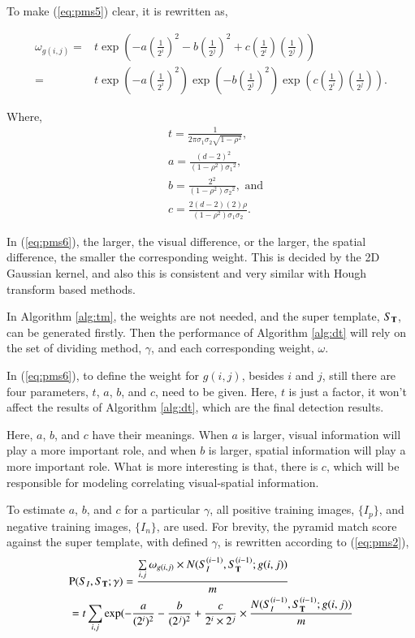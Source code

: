 \documentclass[paper]{ieice}
\begin{document}
To make (\ref{eq:pms5}) clear, it is rewritten as,

\begin{equation}
\label{eq:pms6}
\begin{aligned}
\omega_{g(i,j)}=& t \exp(-a (\frac 1 {2^i})^2 - b (\frac 1 {2^j})^2 + c (\frac 1 {2^i}) (\frac 1 {2^j}))\\
                =& t \exp(-a (\frac 1 {2^i})^2) \exp(- b (\frac 1 {2^j})^2 )\exp ( c (\frac 1 {2^i}) (\frac 1 {2^j})).
\end{aligned}
\end{equation}

Where,
\[\begin{aligned}
&t= \frac 1 {2 \pi \sigma_1 \sigma_2 \sqrt{1-\rho^2} } , \\
&a= \frac {(d-2)^2  }{(1-\rho^2){\sigma_1}^2},\\
&b= \frac{2^2 }{(1-\rho^2){\sigma_2}^2 },\mbox{ and}\\
&c= \frac{2 (d-2) (2)  \rho  }{(1-\rho^2){\sigma_1}{\sigma_2} }.
\end{aligned}
\]

In (\ref{eq:pms6}), the larger, the visual difference, or the larger, the spatial difference, the smaller the corresponding weight. This is decided by the 2D Gaussian kernel, and also this is consistent and very similar with Hough transform based methods.

In Algorithm \ref{alg:tm}, the weights are not needed, and the super template, $S_{\bf T}$, can be generated firstly. Then the performance of Algorithm \ref{alg:dt} will rely on the set of dividing method, $\gamma$, and each corresponding weight, $\omega$.


In (\ref{eq:pms6}), to define the weight for $g(i,j)$, besides $i$ and $j$, still there are four parameters, $t$, $a$, $b$, and $c$, need to be given. Here, $t$ is just a factor, it won't affect the results of Algorithm \ref{alg:dt}, which are the final detection results.

Here, $a$, $b$, and $c$ have their meanings. When $a$ is larger, visual information will play a more important role, and when $b$ is larger, spatial information will play a more important role. What is more interesting is that, there is $c$, which will be responsible for modeling correlating visual-spatial information.

To estimate $a$, $b$, and $c$ for a particular $\gamma$, all positive training images, $\{I_p\}$, and negative training images, $\{I_n\}$, are used. For brevity, the pyramid match score against the super template, with defined $\gamma$, is rewritten according to (\ref{eq:pms2}),
\begin{equation}
\begin{aligned}
&{\rm P}(S_{I},S_{\bf{T}};\gamma)=\frac{ \sum\limits_{i,j}{{\omega}_{g(i,j)}\times N(S_I^{(i-1)},S_{\bf T}^{(i-1)}; g(i,j)) }}{m}\\
&=t \sum\limits_{i,j}{  \exp(- \frac a {(2^i)^2} - \frac b {(2^j)^2} +  \frac c {2^i \times 2^j}   \times \frac{ N(S_I^{(i-1)},S_{\bf T}^{(i-1)}; g(i,j))} m }\\
\end{aligned}
\label{eq:pms7}
\end{equation}
\end{document}

